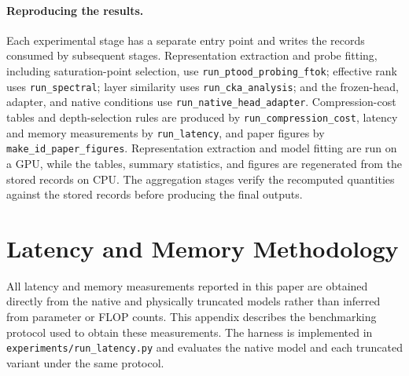 \documentclass{article}
\begin{document}
\paragraph{Reproducing the results.}
Each experimental stage has a separate entry point and writes the records consumed by subsequent stages. Representation extraction and probe fitting, including saturation-point selection, use
\texttt{run\_ptood\_probing\_ftok}; effective rank uses
\texttt{run\_spectral}; layer similarity uses
\texttt{run\_cka\_analysis}; and the frozen-head, adapter, and native conditions use
\texttt{run\_native\_head\_adapter}. Compression-cost tables and depth-selection rules are produced by
\texttt{run\_compression\_cost}, latency and memory measurements by
\texttt{run\_latency}, and paper figures by
\texttt{make\_id\_paper\_figures}. Representation extraction and model fitting are run on a GPU, while the tables, summary statistics, and figures are regenerated from the stored records on CPU. The aggregation stages verify the recomputed quantities against the stored records before producing the final outputs.


\section{Latency and Memory Methodology}
\label{app:latency-methodology}

All latency and memory measurements reported in this paper are obtained directly from the native and physically truncated models rather than inferred from parameter or FLOP counts. This appendix describes the benchmarking protocol used to obtain these measurements. The harness is implemented in \texttt{experiments/run\_latency.py} and evaluates the native model and each truncated variant under the same protocol.
\end{document}
